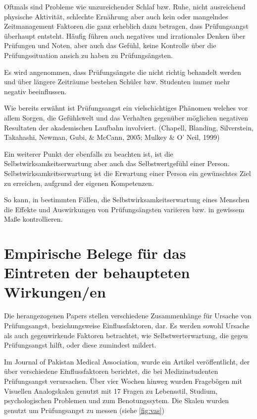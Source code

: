 \documentclass[11pt, a4paper]{article}
\begin{document}
Oftmals sind Probleme wie unzureichender Schlaf bzw. Ruhe, nicht ausreichend physische Aktivität, schlechte Ernährung aber auch kein oder mangelndes Zeitmanagement Faktoren die ganz erheblich dazu betragen, dass Prüfungsangst überhaupt entsteht. Häufig führen auch negatives und irrationales Denken über Prüfungen und Noten, aber auch das Gefühl, keine Kontrolle über die Prüfungssituation ansich zu haben zu Prüfungsängsten. \cite{hashmat2008factors}

Es wird angenommen, dass Prüfungsängste die nicht richtig behandelt werden und über längere Zeiträume bestehen Schüler bzw. Studenten immer mehr negativ beeinflussen. 

Wie bereits erwähnt ist Prüfungsangst ein vielschichtiges Phänomen welches vor allem Sorgen, die Gefühlswelt und das Verhalten gegenüber möglichen negativen Resultaten der akademischen Laufbahn involviert. (Chapell, Blanding, Silverstein, Takahashi, Newman, Gubi, \& McCann, 2005; Mulkey \& O’ Neil, 1999)

Ein weiterer Punkt der ebenfalls zu beachten ist, ist die Selbstwirksamkeitserwartung aber auch das Selbstwertgefühl einer Person. Selbstwirksamkeitserwartung ist die Erwartung einer Person ein gewünschtes Ziel zu erreichen, aufgrund der eigenen Kompetenzen.

So kann, in bestimmten Fällen, die Selbstwirksamkeitserwartung eines Menschen die Effekte und Auswirkungen von Prüfungsängsten variieren bzw. in gewissem Maße kontrollieren. \cite{barrows2013anxiety}

\newpage
\section*{Empirische Belege für das Eintreten der behaupteten Wirkungen/en}

	Die herangezogenen Papers stellen verschiedene Zusammenhänge für Ursache von\\ Prüfungsangst, beziehungsweise Einflussfaktoren, dar. Es werden sowohl Ursache als auch gegenwirkende Faktoren betrachtet, wie Selbstwerterwartung, die gegen Prüfungsangst hilft, oder diese zumindest mildert.

	Im Journal of Pakistan Medical Association, wurde ein Artikel veröffentlicht, der über verschiedene Einflussfaktoren berichtet, die bei Medizinstudenten Prüfungsangst verursachen. Über vier Wochen hinweg wurden Fragebögen mit Visuellen Analogskalen genutzt mit 17 Fragen zu Lebensstil, Studium, psychologischen Problemen und zum Benotungssytem. Die Skalen wurden genutzt um Prüfungsangst zu messen (siehe \cref{fig:vas}) \cite{hashmat2008factors}
\end{document}
